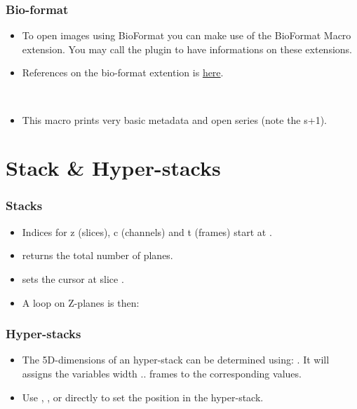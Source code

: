 \begin{frame}
  \frametitle<presentation>{Bio-format}
  \begin{itemize}
  \item To open images using BioFormat you can make use of the
    BioFormat Macro extension. You may call the plugin to have
    informations on these extensions.
  \item<article> References on the bio-format extention is
    \href{https://www.openmicroscopy.org/site/support/bio-formats5.1/users/imagej/}{here}.
  \end{itemize}
\end{frame}

\begin{frame}
  \begin{example}~\par
    \begin{itemize}
    \item This macro prints very basic metadata and open series (note the s+1).
      
    \end{itemize}
  \end{example}
\end{frame}

\section{Stack \& Hyper-stacks}
\begin{frame}[fragile]
  \frametitle<presentation>{Stacks}
  \begin{itemize}
  \item Indices for z (slices), c (channels) and t (frames) start at .
  \item {} returns the total number of planes.
  \item {} sets the cursor at slice .
  \item A loop on Z-planes is then:\par
    
  \end{itemize}
\end{frame}

\begin{frame}
  \frametitle<presentation>{Hyper-stacks}
  \begin{itemize}
  \item The 5D-dimensions of an hyper-stack can be determined using:
    . It
    will assigns the variables width .. frames to the corresponding
    values.
  \item Use , ,
     or directly
     to set the position in the
    hyper-stack.
  \end{itemize}
\end{frame}

